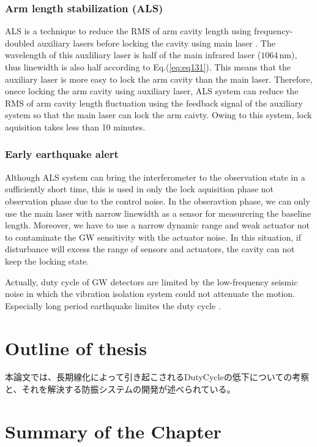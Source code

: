 \subsubsection{Arm length stabilization (ALS)}
ALS is a technique to reduce the RMS of arm cavity length using frequency-doubled auxiliary lasers before locking the cavity using main laser \cite{mullavey2012arm,izumi2012multi}. The wavelength of this auxliliary laser is half of the main infrared laser ($1064\,\mathrm{nm}$), thus linewidth is also half according to Eq.(\ref{eq:eq131}). This means that the auxiliary laser is more easy to lock the arm cavity than the main laser. Therefore, onece locking the arm cavity using auxiliary laser, ALS system can reduce the RMS of arm cavity length fluctuation using the feedback signal of the auxiliary system so that the main laser can lock the arm caivty. Owing to this system, lock aquisition takes less than 10 minutes.

\subsubsection{Early earthquake alert}
Although ALS system can bring the interferometer to the observation state in a sufficiently short time, this is used in only the lock aquisition phase not observation phase due to the control noise. In the obseravtion phase, we can only use the main laser with narrow linewidth as a sensor for measurering the baseline length. Moreover, we have to use a narrow dynamic range and weak actuator not to contaminate the GW sensitivity with the actuator noise. In this situation, if disturbance will excess the range of sensors and actuators, the cavity can not keep the locking state. 

Actually, duty cycle of GW detectors are limited by the low-frequency seismic noise in which the vibration isolation system could not attenuate the motion. Especially long period earthquake limites the duty cycle \cite{Biscans2018control}. 


\section{Outline of thesis}
本論文では、長期線化によって引き起こされるDutyCycleの低下についての考察と、それを解決する防振システムの開発が述べられている。


\section{Summary of the Chapter}
